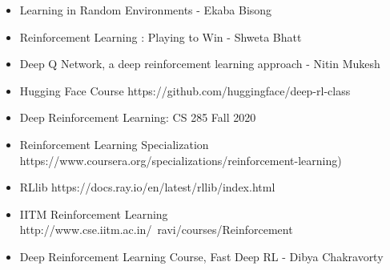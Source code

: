 \begin{frame}
\begin{itemize}
\item Learning in Random Environments - Ekaba Bisong
\item Reinforcement Learning : Playing to Win - Shweta Bhatt
\item Deep Q Network, a deep reinforcement learning approach - Nitin Mukesh
\item Hugging Face Course https://github.com/huggingface/deep-rl-class
\item Deep Reinforcement Learning: CS 285 Fall 2020
\item Reinforcement Learning Specialization https://www.coursera.org/specializations/reinforcement-learning)
\item RLlib https://docs.ray.io/en/latest/rllib/index.html
\item IITM Reinforcement Learning http://www.cse.iitm.ac.in/~ravi/courses/Reinforcement%
\item Deep Reinforcement Learning Course, Fast Deep RL - Dibya Chakravorty
\end{itemize}
\end{frame}

